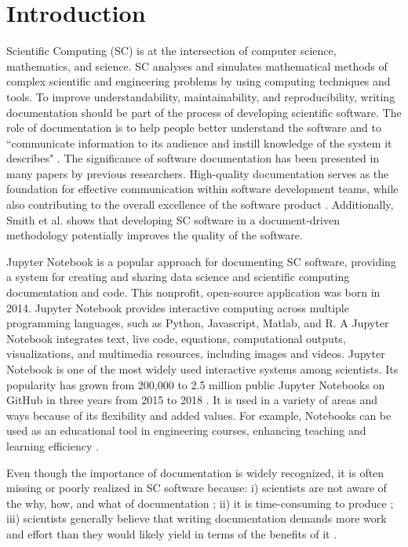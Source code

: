 \chapter{Introduction} \label{chap:intro}
Scientific Computing (SC) is at the intersection of computer science, 
mathematics, and science. SC analyses and simulates mathematical methods of 
complex scientific and engineering problems by using computing techniques and 
tools. To improve understandability, maintainability, and reproducibility, 
writing documentation should be part of the process of developing scientific 
software. The role of documentation is to help people better understand the 
software and to ``communicate information to its audience and instill knowledge 
of the system it describes" \cite{forward2002software}. The significance of 
software documentation has been presented in many papers by previous 
researchers. High-quality documentation serves as the foundation for effective 
communication within software development teams, while also contributing to the 
overall excellence of the software product \cite{parnas2011precise, 
chomal2014significance, kipyegen2013importance}. Additionally, Smith et al. 
\cite{SmithandKoothoor2016, SmithandYu2007} shows that developing SC software 
in a document-driven methodology potentially improves the quality of the 
software. 

Jupyter Notebook is a popular approach for documenting SC software, providing a 
system for creating and sharing data science and scientific computing 
documentation and code. This nonprofit, open-source application was born in 
2014. Jupyter Notebook provides interactive computing across multiple 
programming languages, such as Python, Javascript, Matlab, and R. A Jupyter 
Notebook integrates text, live code, equations, computational outputs, 
visualizations, and multimedia resources, including images and videos. Jupyter 
Notebook is one of the most widely used interactive systems among scientists. 
Its popularity has grown from 200,000 to 2.5 million public Jupyter Notebooks 
on GitHub in three years from 2015 to 2018 \cite{Jeffrey2018}. It is used in a 
variety of areas and ways because of its flexibility and added values. For 
example, Notebooks can be used as an educational tool in engineering courses, 
enhancing teaching and learning efficiency \cite{cardoso2019using, zhao2019use}.

Even though the importance of documentation is widely recognized, it is often 
missing or poorly realized in SC software because: i) scientists are not aware 
of the why, how, and what of documentation \cite{hermann2022documenting, 
chang2022understanding}; ii) it is time-consuming to produce 
\cite{sanders2008dealing}; iii) scientists generally believe that writing 
documentation demands more work and effort than they would likely yield in 
terms of the benefits of it \cite{smith2016advantages}.

